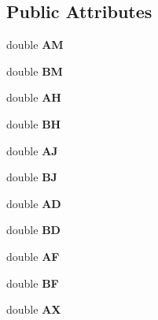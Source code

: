 \subsection*{Public Attributes}
\begin{DoxyCompactItemize}
\item 
double {\bfseries AM}\hypertarget{classIschBR_aed8baf4a072b672b0979089af79d7488}{}\label{classIschBR_aed8baf4a072b672b0979089af79d7488}

\item 
double {\bfseries BM}\hypertarget{classIschBR_adc8a50c4056a93bcabcfd4a7fcc74b2f}{}\label{classIschBR_adc8a50c4056a93bcabcfd4a7fcc74b2f}

\item 
double {\bfseries AH}\hypertarget{classIschBR_a5b5dc12c6e18ef85ebd130f52d23c1d4}{}\label{classIschBR_a5b5dc12c6e18ef85ebd130f52d23c1d4}

\item 
double {\bfseries BH}\hypertarget{classIschBR_a3f9b8ee5397d1797bafba49969981a7b}{}\label{classIschBR_a3f9b8ee5397d1797bafba49969981a7b}

\item 
double {\bfseries AJ}\hypertarget{classIschBR_a50dc30fbfe10a7553d7984bf9fd4be2a}{}\label{classIschBR_a50dc30fbfe10a7553d7984bf9fd4be2a}

\item 
double {\bfseries BJ}\hypertarget{classIschBR_a9304d0980cea64fc76dc950634403383}{}\label{classIschBR_a9304d0980cea64fc76dc950634403383}

\item 
double {\bfseries AD}\hypertarget{classIschBR_abdfac53fe5b416795b5a4db0eca11cde}{}\label{classIschBR_abdfac53fe5b416795b5a4db0eca11cde}

\item 
double {\bfseries BD}\hypertarget{classIschBR_ab4e49a2b841f74014f78f6ac671663b6}{}\label{classIschBR_ab4e49a2b841f74014f78f6ac671663b6}

\item 
double {\bfseries AF}\hypertarget{classIschBR_ae69b3ba1322eed3608c018844d85b6e9}{}\label{classIschBR_ae69b3ba1322eed3608c018844d85b6e9}

\item 
double {\bfseries BF}\hypertarget{classIschBR_a071d3941063e75370ae2075cbde7fe6c}{}\label{classIschBR_a071d3941063e75370ae2075cbde7fe6c}

\item 
double {\bfseries AX}\hypertarget{classIschBR_ab462b488ece3c9e59fe163dbe06b8040}{}\label{classIschBR_ab462b488ece3c9e59fe163dbe06b8040}


\end{DoxyCompactItemize}
